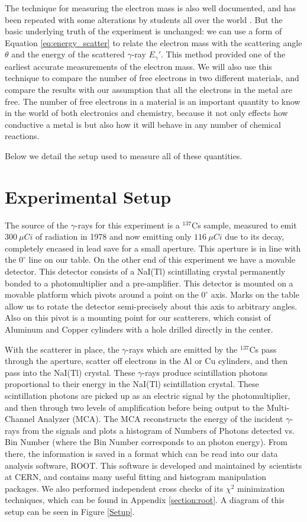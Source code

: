 \documentclass[%
 reprint,
 amsmath,amssymb,
 aps,
 pra,
]{revtex4-1}
\begin{document}
The technique for measuring the electron mass is also well documented, and has been repeated with some alterations by students all over the world \cite{emass_1, emass_2, emass_3}. But the basic underlying truth of the experiment is unchanged: we can use a form of Equation \ref{eq:energy_scatter} to relate the electron mass with the scattering angle $\theta$ and the energy of the scattered $\gamma$-ray $E_\gamma '$. This method provided one of the earliest accurate measurements of the electron mass. We will also use this technique to compare the number of free electrons in two different materials, and compare the results with our assumption that all the electrons in the metal are free. The number of free electrons in a material is an important quantity to know in the world of both electronics and chemistry, because it not only effects how conductive a metal is but also how it will behave in any number of chemical reactions.

Below we detail the setup used to measure all of these quantities.

\section{Experimental Setup}

The source of the $\gamma$-rays for this experiment is a $^{137}$Cs sample, measured to emit $300~\mu Ci$ of radiation in 1978 and now emitting only $116~\mu Ci$ due to its decay, completely encased in lead save for a small aperture. This aperture is in line with the $0^\circ$ line on our table. On the other end of this experiment we have a movable detector. This detector consists of a NaI(Tl) scintillating crystal permanently bonded to a photomultiplier and a pre-amplifier. This detector is mounted on a movable platform which pivots around a point on the $0^\circ$ axis. Marks on the table allow us to rotate the detector semi-precisely about this axis to arbitrary angles. Also on this pivot is a mounting point for our scatterers, which consist of Aluminum and Copper cylinders with a hole drilled directly in the center. 

With the scatterer in place, the $\gamma$-rays which are emitted by the $^{137}$Cs pass through the aperture, scatter off electrons in the Al or Cu cylinders, and then pass into the NaI(Tl) crystal. These $\gamma$-rays produce scintillation photons proportional to their energy in the NaI(Tl) scintillation crystal. These scintillation photons are picked up as an electric signal by the photomultiplier, and then through two levels of amplification before being output to the Multi-Channel Analyzer (MCA). The MCA reconstructs the energy of the incident $\gamma$-rays from the signals and plots a histogram of Numbers of Photons detected vs. Bin Number (where the Bin Number corresponds to an photon energy). From there, the information is saved in a format which can be read into our data analysis software, ROOT. This software is developed and maintained by scientists at CERN, and contains many useful fitting and histogram manipulation packages. We also performed independent cross checks of its $\chi^2$ minimization techniques, which can be found in Appendix \ref{section:root}. A diagram of this setup can be seen in Figure \ref{Setup}.
\end{document}
